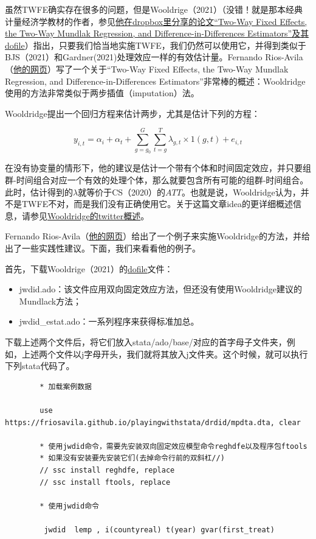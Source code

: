 \documentclass[cn,12pt,math=newtx,citestyle=gb7714-2015,bibstyle=gb7714-2015]{elegantbook}
\begin{document}
	虽然TWFE确实存在很多的问题，但是Wooldrige（2021）（没错！就是那本经典计量经济学教材的作者，参见\href{https://www.dropbox.com/sh/zj91darudf2fica/AADj_jaf5ZuS1muobgsnxS6Za?dl=0}{他在dropbox里分享的论文“Two-Way Fixed Effects, the Two-Way Mundlak Regression, and Difference-in-Differences Estimators”及其dofile}）指出，只要我们恰当地实施TWFE，我们仍然可以使用它，并得到类似于BJS（2021）和Gardner(2021)处理效应一样的有效估计量。Fernando Rios-Avila（\href{https://friosavila.github.io/playingwithstata/main_jwdid.html}{他的网页}）写了一个关于“Two-Way Fixed Effects, the Two-Way Mundlak Regression, and Difference-in-Differences Estimators”非常棒的概述：Wooldridge使用的方法非常类似于两步插值（imputation）法。
	
	Wooldridge提出一个回归方程来估计两步，尤其是估计下列的方程：
	
	\begin{equation}
		y_{i,t} = \alpha_i +\alpha_t + \sum_{g=g_0}^{G}\sum_{t=g}^{T} \lambda_{g,t} \times 1(g,t) +e_{i,t}
	\end{equation}
	
	在没有协变量的情形下，他的建议是估计一个带有个体和时间固定效应，并只要组群-时间组合对应一个有效的处理个体，那么就要包含所有可能的组群-时间组合。此时，估计得到的$\lambda$就等价于CS（2020）的$ATT$。也就是说，Wooldridge认为，并不是TWFE不对，而是我们没有正确使用它。关于这篇文章idea的更详细概述信息，请参见\href{https://twitter.com/jmwooldridge/status/1427472491367305219}{Wooldridge的twitter概述}。
	
	Fernando Rios-Avila（\href{https://friosavila.github.io/playingwithstata/main_jwdid.html}{他的网页}）给出了一个例子来实施Wooldridge的方法，并给出了一些实践性建议。下面，我们来看看他的例子。
	
	首先，下载Wooldrige（2021）的\href{https://www.dropbox.com/sh/zj91darudf2fica/AADj_jaf5ZuS1muobgsnxS6Za?dl=0}{dofile}文件：
	
	\begin{itemize}
		\item jwdid.ado：该文件应用双向固定效应方法，但还没有使用Wooldridge建议的Mundlack方法；
		\item jwdid\_estat.ado：一系列程序来获得标准加总。
	\end{itemize}
	
	下载上述两个文件后，将它们放入stata/ado/base/对应的首字母子文件夹，例如，上述两个文件以j字母开头，我们就将其放入j文件夹。这个时候，就可以执行下列stata代码了。
	
	\begin{lstlisting}
		* 加载案例数据
		
		use https://friosavila.github.io/playingwithstata/drdid/mpdta.dta, clear
		
		* 使用jwdid命令，需要先安装双向固定效应模型命令reghdfe以及程序包ftools
		* 如果没有安装要先安装它们(去掉命令行前的双斜杠//)
		// ssc install reghdfe, replace
		// ssc install ftools, replace
		
		* 使用jwdid命令
		
		 jwdid  lemp , i(countyreal) t(year) gvar(first_treat)
		 
	\end{lstlisting}
\end{document}
